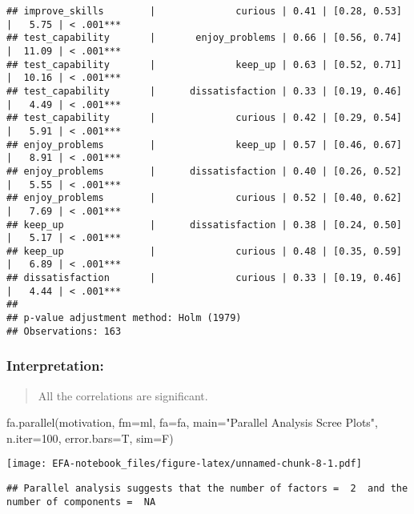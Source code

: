 \documentclass[
]{article}
\newenvironment{Shaded}{\begin{snugshade}}{\end{snugshade}}
\newcommand{\AttributeTok}[1]{\textcolor[rgb]{0.77,0.63,0.00}{#1}}
\newcommand{\DecValTok}[1]{\textcolor[rgb]{0.00,0.00,0.81}{#1}}
\newcommand{\FunctionTok}[1]{\textcolor[rgb]{0.00,0.00,0.00}{#1}}
\newcommand{\NormalTok}[1]{#1}
\newcommand{\StringTok}[1]{\textcolor[rgb]{0.31,0.60,0.02}{#1}}
\begin{document}
\begin{verbatim}
## improve_skills        |              curious | 0.41 | [0.28, 0.53] |   5.75 | < .001***
## test_capability       |       enjoy_problems | 0.66 | [0.56, 0.74] |  11.09 | < .001***
## test_capability       |              keep_up | 0.63 | [0.52, 0.71] |  10.16 | < .001***
## test_capability       |      dissatisfaction | 0.33 | [0.19, 0.46] |   4.49 | < .001***
## test_capability       |              curious | 0.42 | [0.29, 0.54] |   5.91 | < .001***
## enjoy_problems        |              keep_up | 0.57 | [0.46, 0.67] |   8.91 | < .001***
## enjoy_problems        |      dissatisfaction | 0.40 | [0.26, 0.52] |   5.55 | < .001***
## enjoy_problems        |              curious | 0.52 | [0.40, 0.62] |   7.69 | < .001***
## keep_up               |      dissatisfaction | 0.38 | [0.24, 0.50] |   5.17 | < .001***
## keep_up               |              curious | 0.48 | [0.35, 0.59] |   6.89 | < .001***
## dissatisfaction       |              curious | 0.33 | [0.19, 0.46] |   4.44 | < .001***
## 
## p-value adjustment method: Holm (1979)
## Observations: 163
\end{verbatim}

\hypertarget{interpretation-3}{%
\subsubsection{Interpretation:}\label{interpretation-3}}

\begin{quote}
All the correlations are significant.
\end{quote}

\begin{Shaded}
\begin{Highlighting}[]
\FunctionTok{fa.parallel}\NormalTok{(motivation, }\AttributeTok{fm=}\StringTok{\textquotesingle{}ml\textquotesingle{}}\NormalTok{, }\AttributeTok{fa=}\StringTok{\textquotesingle{}fa\textquotesingle{}}\NormalTok{, }\AttributeTok{main=}\StringTok{"Parallel Analysis Scree Plots"}\NormalTok{, }\AttributeTok{n.iter=}\DecValTok{100}\NormalTok{, }\AttributeTok{error.bars=}\NormalTok{T, }\AttributeTok{sim=}\NormalTok{F)}
\end{Highlighting}
\end{Shaded}

\texttt{[image: EFA-notebook\_files/figure-latex/unnamed-chunk-8-1.pdf]}

\begin{verbatim}
## Parallel analysis suggests that the number of factors =  2  and the number of components =  NA
\end{verbatim}
\end{document}
